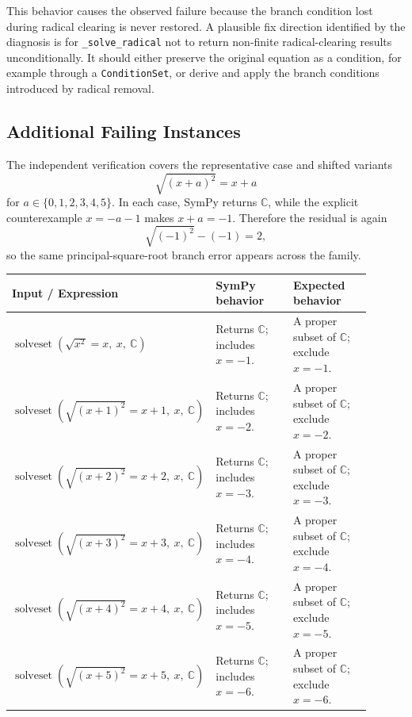 \documentclass[11pt]{article}
\begin{document}
This behavior causes the observed failure because the branch condition lost during radical clearing is never restored. A plausible fix direction identified by the diagnosis is for \texttt{\_solve\_radical} not to return non-finite radical-clearing results unconditionally. It should either preserve the original equation as a condition, for example through a \texttt{ConditionSet}, or derive and apply the branch conditions introduced by radical removal.

\subsection{Additional Failing Instances}

The independent verification covers the representative case and shifted variants
\[
    \sqrt{(x+a)^2}=x+a
\]
for \(a\in\{0,1,2,3,4,5\}\). In each case, SymPy returns \(\mathbb{C}\), while the explicit counterexample \(x=-a-1\) makes \(x+a=-1\). Therefore the residual is again
\[
    \sqrt{(-1)^2}-(-1)=2,
\]
so the same principal-square-root branch error appears across the family.

\begin{center}
\renewcommand{\arraystretch}{1.3}
\begin{tabular}{@{}>{\raggedright\arraybackslash}p{0.44\linewidth}>{\raggedright\arraybackslash}p{0.23\linewidth}>{\raggedright\arraybackslash}p{0.23\linewidth}@{}}
\toprule
\textbf{Input / Expression} & \textbf{SymPy behavior} & \textbf{Expected behavior} \\
\midrule
\(\operatorname{solveset}(\sqrt{x^2}=x,\ x,\ \mathbb{C})\) & Returns \(\mathbb{C}\); includes \(x=-1\). & A proper subset of \(\mathbb{C}\); exclude \(x=-1\). \\
\(\operatorname{solveset}(\sqrt{(x+1)^2}=x+1,\ x,\ \mathbb{C})\) & Returns \(\mathbb{C}\); includes \(x=-2\). & A proper subset of \(\mathbb{C}\); exclude \(x=-2\). \\
\(\operatorname{solveset}(\sqrt{(x+2)^2}=x+2,\ x,\ \mathbb{C})\) & Returns \(\mathbb{C}\); includes \(x=-3\). & A proper subset of \(\mathbb{C}\); exclude \(x=-3\). \\
\(\operatorname{solveset}(\sqrt{(x+3)^2}=x+3,\ x,\ \mathbb{C})\) & Returns \(\mathbb{C}\); includes \(x=-4\). & A proper subset of \(\mathbb{C}\); exclude \(x=-4\). \\
\(\operatorname{solveset}(\sqrt{(x+4)^2}=x+4,\ x,\ \mathbb{C})\) & Returns \(\mathbb{C}\); includes \(x=-5\). & A proper subset of \(\mathbb{C}\); exclude \(x=-5\). \\
\(\operatorname{solveset}(\sqrt{(x+5)^2}=x+5,\ x,\ \mathbb{C})\) & Returns \(\mathbb{C}\); includes \(x=-6\). & A proper subset of \(\mathbb{C}\); exclude \(x=-6\). \\
\bottomrule
\end{tabular}
\end{center}
\end{document}
